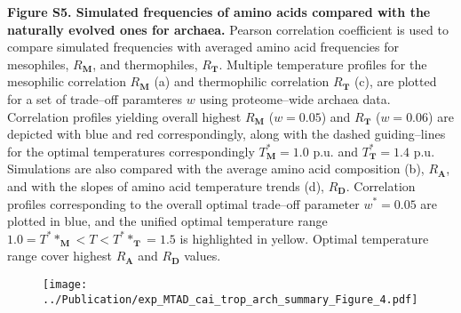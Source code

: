 \documentclass{report}
\begin{document}
{\bf Figure S5. Simulated frequencies of amino acids compared with the naturally evolved ones for archaea.} Pearson correlation coefficient is used to compare simulated frequencies with averaged amino acid frequencies for mesophiles, $R_{\mathbf{M}}$, and thermophiles, $R_{\mathbf{T}}$. Multiple temperature profiles for the mesophilic correlation $R_{\mathbf{M}}$ (a) and thermophilic correlation $R_{\mathbf{T}}$ (c), are plotted for a set of trade--off paramteres $w$ using proteome--wide archaea data. Correlation profiles yielding overall highest $R_{\mathbf{M}}$ ($w=0.05$) and $R_{\mathbf{T}}$ ($w=0.06$) are depicted with blue and red correspondingly, along with the dashed guiding--lines for the optimal temperatures correspondingly $T^*_{\mathbf{M}}=1.0$ p.u.  and $T^*_{\mathbf{T}}=1.4$ p.u. Simulations are also compared with the average amino acid composition (b), $R_{\mathbf{A}}$, and with the slopes of amino acid temperature trends (d), $R_{\mathbf{D}}$. Correlation profiles corresponding to the overall optimal trade--off parameter $w^*=0.05$ are plotted in blue, and the unified optimal temperature range $1.0=T^**_{\mathbf{M}}<T<T^**_{\mathbf{T}}=1.5$ is highlighted in yellow. Optimal temperature range cover highest $R_{\mathbf{A}}$ and $R_{\mathbf{D}}$ values.


\begin{figure}[h!]
	\centering
	\texttt{[image: ../Publication/exp\_MTAD\_cai\_trop\_arch\_summary\_Figure\_4.pdf]}
\end{figure}
\end{document}

